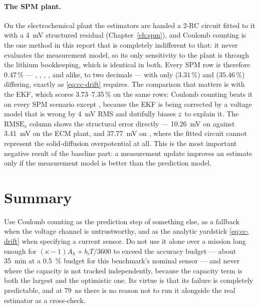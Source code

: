 \paragraph{The SPM plant.} On the electrochemical plant the estimators are handed a 2-RC circuit
fitted to it with a \SI{4}{\milli\volt} structured residual (Chapter~\ref{ch:spm}), and Coulomb
counting is the one method in this report that is completely indifferent to that: it never evaluates
the measurement model, so its only sensitivity to the plant is through the lithium bookkeeping,
which is identical in both. Every SPM row is therefore $0.47\,\%$ --- ,
, , ,  and 
alike, to two decimals --- with only  ($3.31\,\%$) and 
($35.46\,\%$) differing, exactly as \eqref{eq:cc-drift} requires. The comparison that matters is
with the EKF, which scores \numrange{3.73}{7.35}\,\% on the same rows: Coulomb counting beats it on
every SPM scenario except , because the EKF is being corrected by a voltage
model that is wrong by \SI{4}{\milli\volt} RMS and dutifully biases $z$ to explain it. The
$\text{RMSE}_v$ column shows the structural error directly --- \SI{10.26}{\milli\volt} on
 against \SI{3.41}{\milli\volt} on the ECM plant, and \SI{37.77}{\milli\volt} on
, where the fitted circuit cannot represent the solid-diffusion overpotential at all.
This is the most important negative result of the baseline part: a measurement update improves an
estimate only if the measurement model is better than the prediction model.

\section{Summary}
Use Coulomb counting as the prediction step of something else, as a fallback when the voltage
channel is untrustworthy, and as the analytic yardstick \eqref{eq:cc-drift} when specifying a
current sensor. Do not use it alone over a mission long enough for
$(\kappa-1)A_h + b_iT/3600$ to exceed the accuracy budget --- about \SI{35}{\minute} at a
\SI{0.5}{\percent} budget for this benchmark's nominal sensor --- and never where the capacity is
not tracked independently, because the capacity term is both the largest and the optimistic one. Its
virtue is that its failure is completely predictable, and at \SI{79}{\nano\second} there is no
reason not to run it alongside the real estimator as a cross-check.
